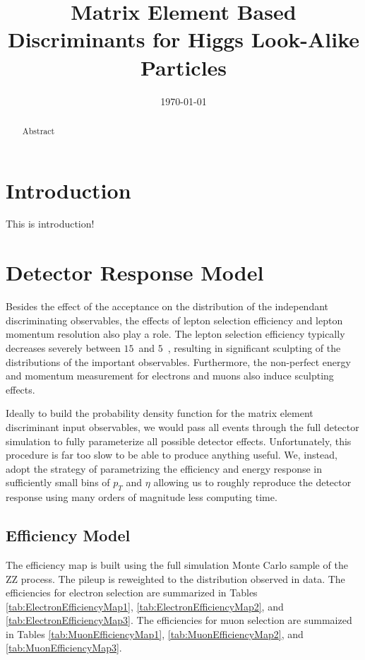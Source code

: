 \documentclass{cmspaper}
\begin{document}
\begin{titlepage}


  \date{\today}

  \title{Matrix Element Based Discriminants for Higgs Look-Alike Particles}

  

  \begin{abstract}
  Abstract
  \end{abstract} 

\end{titlepage}
\tableofcontents
\newpage 

\section{Introduction}
  \label{sec:intro}

This is introduction!

\section{Detector Response Model}
\label{sec:DetectorResponseModel}
Besides the effect of the acceptance on the distribution of the independant discriminating observables,
the effects of lepton selection efficiency and lepton momentum resolution also play a role. The lepton
selection efficiency typically decreases severely between $15$~\GeV and $5$~\GeV, resulting in 
significant sculpting of the distributions of the important observables. Furthermore, the 
non-perfect energy and momentum measurement for electrons and muons also induce sculpting effects.

Ideally to build the probability density function for the matrix element discriminant input observables,
we would pass all events through the full detector simulation to fully parameterize all possible
detector effects. Unfortunately, this procedure is far too slow to be able to produce anything useful. 
We, instead, adopt the strategy of parametrizing the efficiency and energy response in sufficiently
small bins of $p_{T}$ and $\eta$ allowing us to roughly reproduce the detector response using many
orders of magnitude less computing time.

\subsection{Efficiency Model}
\label{sec:EfficiencyModel}
The efficiency map is built using the full simulation Monte Carlo sample of the ZZ process. 
The pileup is reweighted to the distribution observed in data. The efficiencies for 
electron selection are summarized in Tables \ref{tab:ElectronEfficiencyMap1}, 
\ref{tab:ElectronEfficiencyMap2}, and \ref{tab:ElectronEfficiencyMap3}. The efficiencies
for muon selection are summaized in Tables \ref{tab:MuonEfficiencyMap1}, 
\ref{tab:MuonEfficiencyMap2}, and \ref{tab:MuonEfficiencyMap3}.
\end{document}
